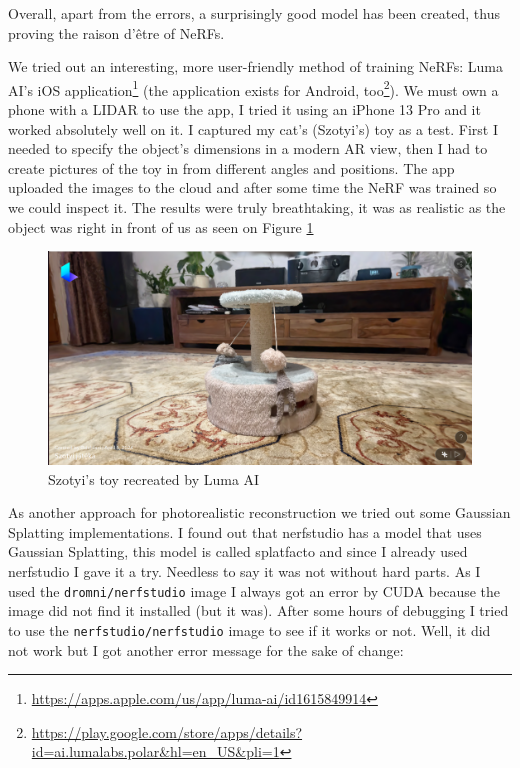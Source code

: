 Overall, apart from the errors, a surprisingly good model has been created, thus proving the raison d'être of NeRFs.

We tried out an interesting, more user-friendly method of training NeRFs: Luma AI's iOS application\footnote{\url{https://apps.apple.com/us/app/luma-ai/id1615849914}} (the application exists for Android, too\footnote{\url{https://play.google.com/store/apps/details?id=ai.lumalabs.polar&hl=en_US&pli=1}}). We must own a phone with a LIDAR to use the app, I tried it using an iPhone 13 Pro and it worked absolutely well on it. I captured my cat's (Szotyi's) toy as a test. First I needed to specify the object's dimensions in a modern AR view, then I had to create pictures of the toy in from different angles and positions. The app uploaded the images to the cloud and after some time the NeRF was trained so we could inspect it. The results were truly breathtaking, it was as realistic as the object was right in front of us as seen on Figure \ref{fig:luma_ai_szotyi_toy}

\begin{figure}[H]
	\centering
	\includegraphics[width=150mm, keepaspectratio]{figures/szotyi_jateka_luma_ai.png}
	\caption{Szotyi's toy recreated by Luma AI}
	\label{fig:luma_ai_szotyi_toy}
\end{figure}

As another approach for photorealistic reconstruction we tried out some Gaussian Splatting\cite{3DGS} implementations. I found out that nerfstudio has a model that uses Gaussian Splatting, this model is called splatfacto\cite{splatfacto} and since I already used nerfstudio I gave it a try. Needless to say it was not without hard parts. As I used the \verb|dromni/nerfstudio| image I always got an error by CUDA because the image did not find it installed (but it was). After some hours of debugging I tried to use the \verb|nerfstudio/nerfstudio| image to see if it works or not. Well, it did not work but I got another error message for the sake of change:

